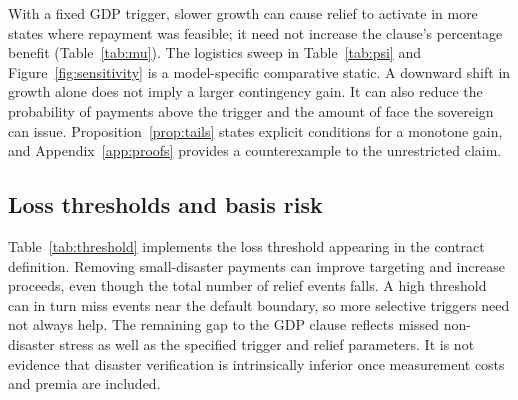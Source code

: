 \documentclass[11pt]{article}
\begin{document}
\begin{table}[t]
\centering\caption{Conditional mean-growth sensitivity in the stress environment, with the GDP trigger fixed at .95 and logistics loading at 1.5.}\label{tab:mu}

\end{table}
\begin{table}[t]
\centering\caption{Logistics sensitivity in the stress environment. The gap is the GDP gain minus the disaster-loss gain at the stated relief fractions; it is a design-specific basis-risk proxy.}\label{tab:psi}

\end{table}
With a fixed GDP trigger, slower growth can cause relief to activate in more states where repayment was feasible; it need not increase the clause's percentage benefit (Table~\ref{tab:mu}). The logistics sweep in Table~\ref{tab:psi} and Figure~\ref{fig:sensitivity} is a model-specific comparative static. A downward shift in growth alone does not imply a larger contingency gain. It can also reduce the probability of payments above the trigger and the amount of face the sovereign can issue. Proposition~\ref{prop:tails} states explicit conditions for a monotone gain, and Appendix~\ref{app:proofs} provides a counterexample to the unrestricted claim.

\subsection{Loss thresholds and basis risk}\label{subsec:threshold}
\begin{table}[t]
\centering\caption{Disaster-loss thresholds in the stress case, with $\kappa_Z=.35$. A zero threshold means every active disaster, excluding non-disaster states.}\label{tab:threshold}

\end{table}
Table~\ref{tab:threshold} implements the loss threshold appearing in the contract definition. Removing small-disaster payments can improve targeting and increase proceeds, even though the total number of relief events falls. A high threshold can in turn miss events near the default boundary, so more selective triggers need not always help. The remaining gap to the GDP clause reflects missed non-disaster stress as well as the specified trigger and relief parameters. It is not evidence that disaster verification is intrinsically inferior once measurement costs and premia are included.


\end{document}
